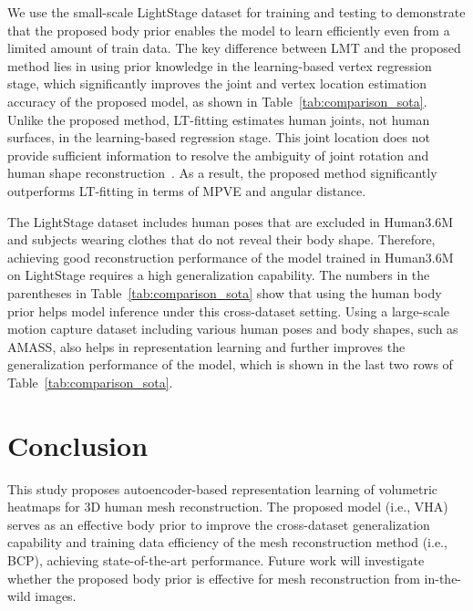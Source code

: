 \documentclass{article}
\begin{document}
We use the small-scale LightStage dataset for training and testing to demonstrate that the proposed body prior enables the model to learn efficiently even from a limited amount of train data. The key difference between LMT and the proposed method lies in using prior knowledge in the learning-based vertex regression stage, which significantly improves the joint and vertex location estimation accuracy of the proposed model, as shown in Table~\ref{tab:comparison_sota}. Unlike the proposed method, LT-fitting estimates human joints, not human surfaces, in the learning-based regression stage. This joint location does not provide sufficient information to resolve the ambiguity of joint rotation and human shape reconstruction~\cite{Chun_2023_WACV}. As a result, the proposed method significantly outperforms LT-fitting in terms of MPVE and angular distance.

The LightStage dataset includes human poses that are excluded in Human3.6M and subjects wearing clothes that do not reveal their body shape. Therefore, achieving good reconstruction performance of the model trained in Human3.6M on LightStage requires a high generalization capability. The numbers in the parentheses in Table~\ref{tab:comparison_sota} show that using the human body prior helps model inference under this cross-dataset setting. Using a large-scale motion capture dataset including various human poses and body shapes, such as AMASS, also helps in representation learning and further improves the generalization performance of the model, which is shown in the last two rows of Table~\ref{tab:comparison_sota}.










\section{Conclusion}
\label{sec:conclusion}

This study proposes autoencoder-based representation learning of volumetric heatmaps for 3D human mesh reconstruction. The proposed model (i.e., VHA) serves as an effective body prior to improve the cross-dataset generalization capability and training data efficiency of the mesh reconstruction method (i.e., BCP), achieving state-of-the-art performance. Future work will investigate whether the proposed body prior is effective for mesh reconstruction from in-the-wild images.






\end{document}
